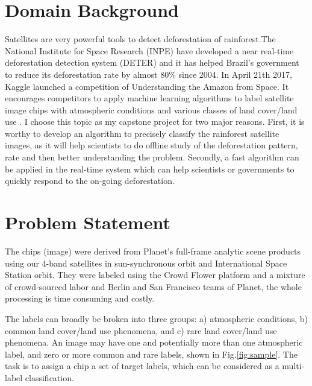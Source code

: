 \documentclass[11pt,oneside,a4paper]{article}
\begin{document}


\begin{multicols}{2}
\section{Domain Background}
\label{S:1}
Satellites are very powerful tools to detect deforestation of rainforest.The National Institute for Space Research (INPE) have developed a near real-time deforestation detection system (DETER) and it has helped Brazil’s government to reduce its deforestation rate by almost $80\%$ since 2004\cite{amazonnature}. In April 21th 2017, Kaggle launched a competition of Understanding the Amazon from Space. It encourages competitors to apply machine learning algorithms to label satellite image chips with atmospheric conditions and various classes of land cover/land use \cite{amazonkaggle}. I choose this topic as my capstone project for two major reasons. First, it is worthy to develop an algorithm to precisely classify the rainforest satellite images, as it will help scientists to do offline study of the deforestation pattern, rate and then better understanding the problem. Secondly, a fast algorithm can be applied in the real-time system which can help scientists or governments to quickly respond to the on-going deforestation.

\section{Problem Statement}
\label{S:2}
The chips (image) were derived from Planet's full-frame analytic scene products using our 4-band satellites in sun-synchronous orbit and International Space Station orbit. They were labeled using the Crowd Flower platform and a mixture of crowd-sourced labor and Berlin and San Francisco teams of Planet, the whole processing is time consuming and costly.

The labels can broadly be broken into three groups: a) atmospheric conditions, b) common land cover/land use phenomena, and c) rare land cover/land use phenomena. An image may have one and potentially more than one atmospheric label, and zero or more common and rare labels, shown in Fig.\ref{fig:sample}. The task is to assign a chip a set of target labels, which can be considered as a multi-label classification.


\end{multicols}
\end{document}
